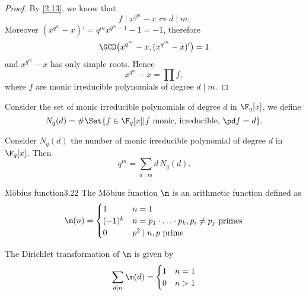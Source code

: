 \begin{proof}
	By \autoref{2.13}, we know that
	\[
		f \mid x^{q^m}-x \iff d \mid m.
	\]
	Moreover \((x^{q^m}-x)' = q^m x^{q^m-1}-1 = -1\), therefore
	\[
		\GCD\big(x^{q^m}-x, (x^{q^m}-x)'\big) = 1
	\]
	and \(x^{q^m}-x\) has only simple roots. Hence
	\[
		x^{q^m}-x = \prod f,
	\]
	where \(f\) are monic irreducible polynomials of degree \(d \mid m\).
\end{proof}

\begin{notz}
	Consider the set of monic irreducible polynomials of degree \(d\) in \(\F_q[x]\), we define
	\[
		N_q(d) = \#\Set{f \in \F_q[x] | f \text{ monic, irreducible, }\pd f = d}.
	\]
\end{notz}

\begin{cor}\label{3.21}
	Consider \(N_q(d)\) the number of monic irreducible polynomial of degree \(d\) in \(\F_q[x]\). Then
	\[
		q^m = \sum_{d\mid m} d\,N_q(d).
	\]
\end{cor}

\begin{defn}{M\"obius function}{3.22}
	The M\"obius function \(\m\) is an arithmetic function defined as
	\[
		\m(n) =
		\begin{cases}
			1      & n = 1                                                     \\
			(-1)^k & n = p_1 \cdot\ldots\cdot p_k, p_i \neq p_j \text{ primes} \\
			0      & p^2 \mid n, p \text{ prime}
		\end{cases}
	\]
\end{defn}

\begin{lem}
	The Dirichlet transformation of \(\m\) is given by
	\[
		\sum_{d\mid n} \m(d) =
		\begin{cases}
			1 & n = 1  \\
			0 & n > 1
		\end{cases}
	\]
\end{lem}


